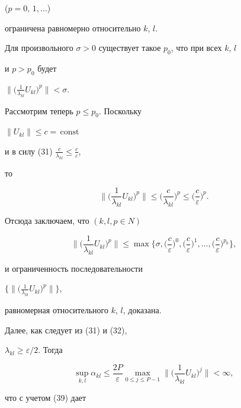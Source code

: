 ($p=0,\,1,\dotsc$)


ограничена равномерно относительно $k$, $l$.





Для произвольного $\sigma>0$ существует такое $p_0$, что при всех $k$, $l$


и $p>p_0$ будет


$\big\|\big(\frac{1}{\lambda_{kl}} U_{kl}\big)^p\big\| < \sigma$.


Рассмотрим теперь $p\le p_0$. Поскольку


$\| U_{kl}\| \le c=\,\text{const}$


и в силу (31)\; ${\frac{c}{\lambda_{kl}}\le\frac{c}{{\varepsilon}}}$,


то


$$


\bigg\|\bigg(\frac{1}{\lambda_{kl}}U_{kl}\bigg)^p\bigg\|


\le \bigg(\frac{c}{\lambda_{kl}}\bigg)^p


\le \bigg(\frac{c}{{\varepsilon}}\bigg)^p.


$$


Отсюда заключаем, что $(k,l,p\in N)$


$$


\bigg\|\bigg(\frac{1}{\lambda_{kl}}U_{kl}\bigg)^p\bigg\|\le \max


\bigg\{\sigma,\bigg(\frac{c}{{\varepsilon}}\bigg)^0,


\bigg(\frac{c}{{\varepsilon}}\bigg)^1,\dotsc,


\bigg(\frac{c}{{\varepsilon}}\bigg)^{p_0}\bigg\},


$$


и ограниченность последовательности


${\big\{\big\|\big(\frac{1}{\lambda_{kl}}U_{kl}\big)^p\big\|\big\}}$,


равномерная относительного $k$, $l$, доказана.





Далее, как следует из (31) и (32),


$\lambda_{kl}\ge \varepsilon/ 2$. Тогда


$$


\sup_{k,l}\alpha_{kl}\le\frac{2P}{{\varepsilon}}\max_{0\le j\le P-1}


\bigg\|\bigg(\frac{1}{\lambda_{kl}}U_{kl}\bigg)^j\bigg\|<\infty,


$$


что с учетом (39) дает


